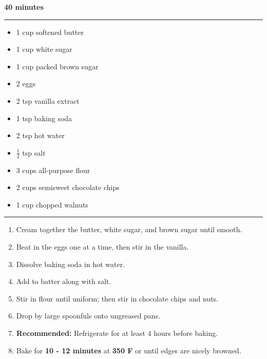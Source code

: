  \hfill {\large \textbf{40 minutes}}

\vspace{15pt} \hrule \vspace{15pt}
\begin{itemize}
	\item 1 cup softened butter
	\item 1 cup white sugar
	\item 1 cup packed brown sugar
	\item 2 eggs
	\item 2 tsp vanilla extract
	\item 1 tsp baking soda
	\item 2 tsp hot water
	\item $\frac{1}{2}$ tsp salt
	\item 3 cups all-purpose flour
	\item 2 cups semisweet chocolate chips
	\item 1 cup chopped walnuts
\end{itemize}

\vspace{15pt} \hrule \vspace{15pt}
\begin{enumerate}
	\item Cream together the butter, white sugar, and brown sugar until smooth.
	\item Beat in the eggs one at a time, then stir in the vanilla.
	\item Dissolve baking soda in hot water.
	\item Add to batter along with salt.
	\item Stir in flour until uniform; then stir in chocolate chips and nuts.
	\item Drop by large spoonfuls onto ungreased pans.
	\item \textbf{Recommended:} Refrigerate for at least 4 hours before baking.
	\item Bake for \textbf{10 - 12 minutes} at \textbf{350 F} or until edges are nicely browned.
\end{enumerate}
